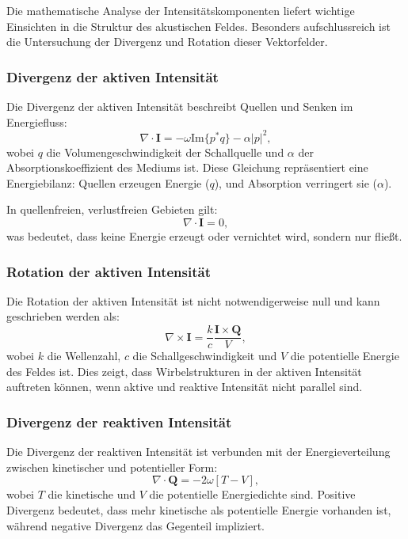Die mathematische Analyse der Intensitätskomponenten liefert wichtige Einsichten in die Struktur des akustischen Feldes. Besonders aufschlussreich ist die Untersuchung der Divergenz und Rotation dieser Vektorfelder.

\subsubsection{Divergenz der aktiven Intensität}

Die Divergenz der aktiven Intensität beschreibt Quellen und Senken im Energiefluss:
\begin{equation}
\nabla \cdot \boldsymbol{I} = -\omega\text{Im}\{p^*q\} - \alpha|p|^2,
\end{equation}
wobei $q$ die Volumengeschwindigkeit der Schallquelle und $\alpha$ der Absorptionskoeffizient des Mediums ist. Diese Gleichung repräsentiert eine Energiebilanz: Quellen erzeugen Energie ($q$), und Absorption verringert sie ($\alpha$).

In quellenfreien, verlustfreien Gebieten gilt:
\begin{equation}
\nabla \cdot \boldsymbol{I} = 0,
\end{equation}
was bedeutet, dass keine Energie erzeugt oder vernichtet wird, sondern nur fließt.

\subsubsection{Rotation der aktiven Intensität}

Die Rotation der aktiven Intensität ist nicht notwendigerweise null und kann geschrieben werden als:
\begin{equation}
\nabla \times \boldsymbol{I} = \frac{k}{c} \frac{\boldsymbol{I} \times \boldsymbol{Q}}{V},
\end{equation}
wobei $k$ die Wellenzahl, $c$ die Schallgeschwindigkeit und $V$ die potentielle Energie des Feldes ist. Dies zeigt, dass Wirbelstrukturen in der aktiven Intensität auftreten können, wenn aktive und reaktive Intensität nicht parallel sind.

\subsubsection{Divergenz der reaktiven Intensität}

Die Divergenz der reaktiven Intensität ist verbunden mit der Energieverteilung zwischen kinetischer und potentieller Form:
\begin{equation}
\nabla \cdot \boldsymbol{Q} = -2 \omega [T-V],
\end{equation}
wobei $T$ die kinetische und $V$ die potentielle Energiedichte sind. Positive Divergenz bedeutet, dass mehr kinetische als potentielle Energie vorhanden ist, während negative Divergenz das Gegenteil impliziert.

